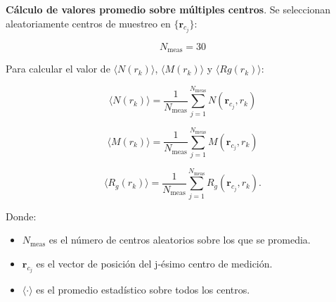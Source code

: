 	\textbf{Cálculo de valores promedio sobre múltiples centros}. Se seleccionan aleatoriamente centros de muestreo en $\{\mathbf{r}_{c_j}\}$:
	
	
	\begin{equation}
		N_{\text{meas}} = 30  
	\end{equation}
	
	Para calcular el valor de $\langle N(r_k) \rangle$, $\langle M(r_k) \rangle$ y $\langle Rg(r_k) \rangle$:
	
	\begin{equation}
		\langle N(r_k) \rangle = \frac{1}{N_{\text{meas}}} 
		\sum_{j=1}^{N_{\text{meas}}} N(\mathbf{r}_{c_j}, r_k)
	\end{equation}
	
	\begin{equation}
		\langle M(r_k) \rangle = \frac{1}{N_{\text{meas}}} 
		\sum_{j=1}^{N_{\text{meas}}} M(\mathbf{r}_{c_j}, r_k)
	\end{equation}
	
	\begin{equation}
		\langle R_g(r_k) \rangle = \frac{1}{N_{\text{meas}}} 
		\sum_{j=1}^{N_{\text{meas}}} R_g(\mathbf{r}_{c_j}, r_k).
	\end{equation}
	
	Donde:
	\begin{itemize}
		\item $N_{\text{meas}}$ es el número de centros aleatorios sobre los que se promedia.
		\item $\mathbf{r}_{c_j}$ es el vector de posición del j-ésimo centro de medición.
		\item $\langle\cdot\rangle$ es el promedio estadístico sobre todos los centros.
	\end{itemize}

